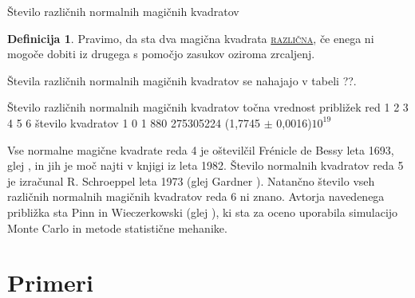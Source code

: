 \documentclass[a4paper,12pt]{article}
\newcommand{\pojem}[1]{\underline{\textsc{#1}}}
\theoremstyle{definition}
\newtheorem{definicija}{Definicija}
\theoremstyle{plain}
\begin{document}
Število različnih normalnih magičnih kvadratov
\begin{definicija}
   Pravimo, da sta dva magična kvadrata \pojem{različna}, če enega ni mogoče dobiti
   iz drugega s pomočjo zasukov oziroma zrcaljenj.
\end{definicija}
Števila različnih normalnih magičnih kvadratov se nahajajo v tabeli ??.

   Število različnih normalnih magičnih kvadratov
      točna vrednost približek
      red 1 2 3 4 5 6
      število kvadratov 1 0 1 880 275305224 (1,7745 $\pm$ 0,0016)$10^{19}$

Vse normalne magične kvadrate reda 4 je oštevilčil Frénicle de Bessy
leta 1693, glej \cite{bessy}, in jih je moč najti v knjigi \cite{berlekamp}
iz leta 1982. Število normalnih kvadratov reda 5 je izračunal
R. Schroeppel leta 1973 (glej Gardner \cite{gardner}).
Natančno število vseh različnih normalnih magičnih kvadratov reda 6 ni znano.
Avtorja navedenega približka sta Pinn in Wieczerkowski (glej \cite{pinn}), ki
sta za oceno uporabila simulacijo Monte Carlo in metode statistične mehanike.


\section{Primeri}
\end{document}
